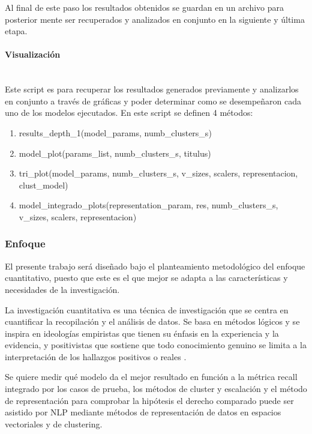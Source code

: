 \documentclass[12pt]{article}
\newcommand{\subsubsubsection}[1]{\paragraph{#1}\mbox{}\\}
\begin{document}
				Al final de este paso los resultados obtenidos se guardan en un archivo para posterior mente ser recuperados y analizados en conjunto en la siguiente y última etapa.
							
				\subsubsubsection{Visualización}
				Este script es para recuperar los resultados generados previamente y analizarlos en conjunto a través de gráficas y poder determinar como se desempeñaron cada uno de los modelos ejecutados.
				En este script se definen 4 métodos:
			
				\begin{enumerate}
					\item results\_depth\_1(model\_params, numb\_clusters\_s)
					
					\item model\_plot(params\_list, numb\_clusters\_s, titulus)
					
					\item tri\_plot(model\_params, numb\_clusters\_s, v\_sizes, scalers, representacion, clust\_model)
					
					\item model\_integrado\_plots(representation\_param, res, numb\_clusters\_s, v\_sizes, scalers, representacion)
				\end{enumerate}	
		
			\subsubsection{Enfoque}
			El  presente trabajo será diseñado bajo el planteamiento metodológico del enfoque cuantitativo, puesto que este es el que mejor se adapta a las características y necesidades de la investigación.
	
			La investigación cuantitativa es una técnica de investigación que se centra en cuantificar la recopilación y el análisis de datos. Se basa en métodos lógicos y se inspira en ideologías empiristas que tienen su énfasis en la experiencia y la evidencia, y positivistas que sostiene que todo conocimiento genuino se limita a la interpretación de los hallazgos positivos o reales \cite{Bryman2012}.

			Se quiere medir qué modelo da el mejor resultado en función a la métrica recall integrado por los casos de prueba, los métodos de cluster y escalación y el método de representación para comprobar la hipótesis el derecho comparado puede ser asistido por NLP mediante métodos de representación de datos en espacios vectoriales y de clustering. 
			
\end{document}
